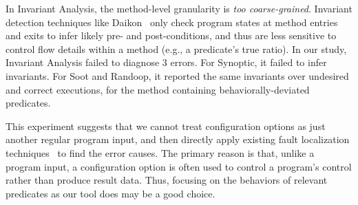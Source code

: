 In Invariant Analysis, the method-level granularity is \textit{too coarse-grained}.
Invariant detection techniques like Daikon~\cite{Ernst:1999}
only check program states at method entries and exits to infer
likely pre- and post-conditions, and thus are less
sensitive to control flow details within a method (e.g., a predicate's
true ratio). In our study, Invariant Analysis failed to diagnose 3
errors.  For Synoptic, it failed to infer invariants.  For Soot and
Randoop, it reported the same invariants
over undesired and correct executions, for
the method containing behaviorally-deviated predicates.





This experiment suggests that we cannot
treat configuration options as just another regular program input,
and then directly apply existing 
fault localization techniques~\cite{Jones:2002, McCamant:2003} to
find the error causes. 
The primary reason is that, unlike a program input,
a configuration option is often used to control a
program's control rather than produce result data. 
Thus, focusing on the behaviors of relevant predicates as our tool does
 may be a good choice.

